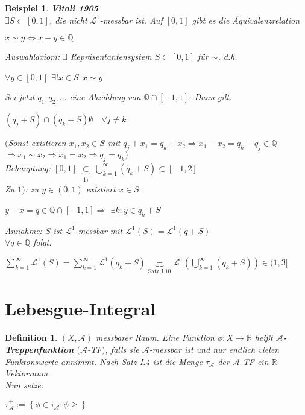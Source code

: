 \documentclass[11pt]{memoir}
\theoremstyle{changebreak}
\newtheorem{Definition}{Definition}[chapter]
\newtheorem{Beispiel}{Beispiel}[chapter]
\begin{document}
\begin{Beispiel}
\emph{\textbf{Vitali 1905}} \\
$\exists S \subset [0, 1]$, die nicht $\mathscr L^1$-messbar ist. Auf $[0, 1]$ gibt es die Äquivalenzrelation
\begin{center}
	$x \sim y \Leftrightarrow x - y \in \mathbb Q$
\end{center}
Auswahlaxiom: $\exists$ Repräsentantensystem $S \subset [0, 1]$ für $\sim$, d.h. 
\begin{center}
	$\forall y \in [0, 1]$ $\exists! x \in S: x \sim y$ 
\end{center}
Sei jetzt $q_1, q_2, ...$ eine Abzählung von $\mathbb Q \cap [-1, 1]$. Dann gilt: 
\begin{center}
	$(q_j + S) \cap (q_k +S)  \emptyset \quad \forall j \ne k$ 
\end{center}
$($Sonst existieren $x_1, x_2 \in S$ mit $q_j +x_1 = q_k + x_2 \Rightarrow x_1-x_2 = q_k -q_j \in \mathbb Q$
$ \Rightarrow x_1 \sim x_2  \Rightarrow x_1 = x_2 \Rightarrow q_j = q_k $\blitzd $ )$ \\

\emph{Behauptung:} $[0, 1]$ $\underbrace{\subset}_{1)}$ $\bigcup\limits_{k=1}^\infty
 (q_k + S) \subset [-1, 2]$ \\
 Zu $1)$: zu $y \in (0, 1)$ existiert $x \in S: $
 \begin{center}
	 $y - x = q \in \mathbb Q \cap [-1, 1] \Rightarrow$ $\exists k: y \in q_k + S$ 
\end{center}

\emph{Annahme:} $S$ ist $\mathscr L^1$-messbar mit $\mathscr L^1(S) = \mathscr L^1(q + S)$\\
$\forall q \in \mathbb Q$ folgt: 
\begin{center}
	$\sum\limits_{k=1}^\infty \mathscr L^1(S) = \sum\limits_{k=1}^\infty \mathscr L^1(q_k + S) \underbrace{=}_ {\text{Satz I.10}} \mathscr L^1\left(\bigcup\limits_{k=1}^\infty (q_k + S) \right) \in (1, 3]$ \blitzd
\end{center}
\end{Beispiel}



\section{Lebesgue-Integral}
\begin{Definition}
$(X, \mathscr A)$ messbarer Raum. Eine Funktion $\phi: X \rightarrow \mathbb R$ heißt \textbf{$\mathscr A$-Treppenfunktion} $(\mathscr A$-TF$)$, falls sie $\mathscr A$-messbar ist und nur endlich vielen Funktonswerte annimmt. Nach Satz I.4 ist die Menge $\tau_ \mathscr A$ der $\mathscr A$-TF ein $\mathbb R$-Vektorraum. \\
Nun setze: 
\begin{center}
	$\tau_\mathscr A^+ := \left\{\phi\in \tau_\mathscr A: \phi \geq\right\}$
\end{center}
\end{Definition}
\end{document}

